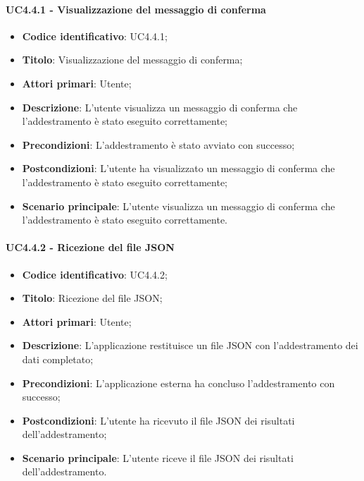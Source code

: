 \paragraph{UC4.4.1 - Visualizzazione del messaggio di conferma}
\begin{itemize}
	\item \textbf{Codice identificativo}: UC4.4.1;
	\item \textbf{Titolo}: Visualizzazione del messaggio di conferma;
	\item \textbf{Attori primari}: Utente;
	\item \textbf{Descrizione}: L'utente visualizza un messaggio di conferma che l'addestramento è stato eseguito correttamente;
	\item \textbf{Precondizioni}: L'addestramento è stato avviato con successo;
	\item \textbf{Postcondizioni}: L'utente ha visualizzato un messaggio di conferma che l'addestramento è stato eseguito correttamente;
	\item \textbf{Scenario principale}: L'utente visualizza un messaggio di conferma che l'addestramento è stato eseguito correttamente.
\end{itemize}


\paragraph{UC4.4.2 - Ricezione del file JSON}
\begin{itemize}
    \item \textbf{Codice identificativo}: UC4.4.2;
    \item \textbf{Titolo}: Ricezione del file JSON;
    \item \textbf{Attori primari}: Utente;
    \item \textbf{Descrizione}: L'applicazione restituisce un file JSON con l'addestramento dei dati completato;
    \item \textbf{Precondizioni}: L'applicazione esterna ha concluso l'addestramento con successo;
    \item \textbf{Postcondizioni}: L'utente ha ricevuto il file JSON dei risultati dell'addestramento;
    \item \textbf{Scenario principale}: L'utente riceve il file JSON dei risultati dell'addestramento.
\end{itemize}
